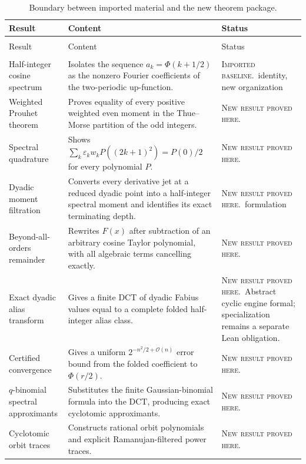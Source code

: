 \documentclass[11pt,oneside]{article}
\theoremstyle{definition}
\theoremstyle{remark}
\newcommand{\bigO}{\mathcal O}
\newcommand{\eps}{\varepsilon}
\newcommand{\PhiU}{\Phi}
\newcommand{\newresult}{\textcolor{newgreen}{\textsc{New result proved here.}}}
\newcommand{\imported}{\textcolor{importblue}{\textsc{Imported baseline.}}}
\begin{document}
{\small
\begin{longtable}{@{}>{\raggedright\arraybackslash}p{}>{\raggedright\arraybackslash}p{}>{\raggedright\arraybackslash}p{}@{}}
\caption{Boundary between imported material and the new theorem package.}\label{tab:contribution-map}\\
\toprule
Result & Content & Status \\
\midrule
\endfirsthead
\multicolumn{3}{c}{\small\itshape Contribution map (continued)}\\[0.3em]
\toprule
Result & Content & Status \\
\midrule
\endhead
\midrule
\multicolumn{3}{r}{\small\itshape Continued on the next page}\\
\endfoot
\bottomrule
\endlastfoot
Half-integer cosine spectrum & Isolates the sequence $a_k=\PhiU(k+1/2)$ as the nonzero Fourier coefficients of the two-periodic up-function. & \imported\ identity, new organization \\
Weighted Prouhet theorem & Proves equality of every positive weighted even moment in the Thue--Morse partition of the odd integers. & \newresult \\
Spectral quadrature & Shows $\sum_k\eps_kw_kP((2k+1)^2)=P(0)/2$ for every polynomial $P$. & \newresult \\
Dyadic moment filtration & Converts every derivative jet at a reduced dyadic point into a half-integer spectral moment and identifies its exact terminating depth. & \newresult\ formulation \\
Beyond-all-orders remainder & Rewrites $F(x)$ after subtraction of an arbitrary cosine Taylor polynomial, with all algebraic terms cancelling exactly. & \newresult \\
Exact dyadic alias transform & Gives a finite DCT of dyadic Fabius values equal to a complete folded half-integer alias class. & \newresult\ Abstract cyclic engine formal; specialization remains a separate Lean obligation. \\
Certified convergence & Gives a uniform $2^{-n^2/2+\bigO(n)}$ error bound from the folded coefficient to $\PhiU(r/2)$. & \newresult \\
$q$-binomial spectral approximants & Substitutes the finite Gaussian-binomial formula into the DCT, producing exact cyclotomic approximants. & \newresult \\
Cyclotomic orbit traces & Constructs rational orbit polynomials and explicit Ramanujan-filtered power traces. & \newresult \\

\end{longtable}}
\end{document}
